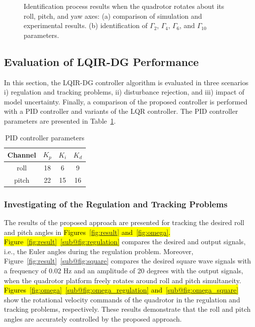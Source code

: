 \documentclass[3p]{elsarticle}
\begin{document}
\begin{figure}[H]
{    }
    \caption{Identification process results when the quadrotor rotates about its roll, pitch, and yaw axes: (a) comparison of simulation and experimental results. (b) identification of $\Gamma_2$, $\Gamma_4$, $\Gamma_6$, and
    $\Gamma_{10}$ parameters.}
    \label{fig:three_degree_identification}
\end{figure}
\subsection{Evaluation of LQIR-DG Performance}
\noindent In this section, the LQIR-DG controller algorithm is evaluated in three scenarios i) regulation and tracking problems, ii) disturbance rejection, and iii) impact of model uncertainty.
Finally, a comparison of the proposed controller is performed with a PID controller and variants of the LQR controller. 
The PID controller parameters are presented in Table~\ref{tab:PID_parameters}.
\begin{table}[H]
    \renewcommand{\arraystretch}{1.3}
    \caption{PID controller parameters}
    \vspace{-0.5cm}
    \begin{center}
        \begin{tabular}{cccc}
        \hline
        \textbf{Channel} & \textbf{$K_p$} & \textbf{$K_i$} & \textbf{$K_d$} \\
        \hline
        roll & 18 & 6 & 9 \\
        pitch & 22 & 15 & 16 \\
        \hline
        \end{tabular}
        \label{tab:PID_parameters}
    \end{center}
\end{table}
\subsubsection{Investigating of the Regulation and Tracking Problems}\label{sec:regulation}
\noindent The results of the proposed approach are presented for tracking the desired roll and pitch angles in 
\hl{Figures~{\ref{fig:result}} and~{\ref{fig:omega}}.
Figure~{\ref{fig:result}}~{\ref{sub@fig:regulation}} }
compares the desired and output signals, i.e., the Euler angles during the regulation problem. Moreover, Figure~\ref{fig:result}~\ref{sub@fig:square} compares the desired square wave signals with a frequency of 0.02 Hz and an amplitude of 20 degrees with the output signals, when the quadrotor platform freely rotates around roll and pitch simultaneity.
\hl{Figures~{\ref{fig:omega}}~{\ref{sub@fig:omega_regulation}} and~{\ref{sub@fig:omega_square}} }
show the rotational velocity commands of the quadrotor in the regulation and tracking problems, respectively. These results demonstrate that the roll and pitch angles are accurately controlled by the proposed approach.
\end{document}
